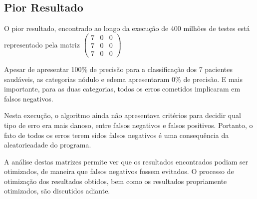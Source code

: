 \documentclass[a4paper,12pt,oneside]{report}
\begin{document}
\subsection{Pior Resultado}
\hspace*{15pt} O pior resultado, encontrado ao longo da execu\c{c}\~{a}o de 400 milh\~{o}es de testes est\'{a} representado pela matriz 
$
\left(\begin{smallmatrix}
7 & 0 & 0 \\
7 & 0 & 0 \\
7 & 0 & 0 
\end{smallmatrix}\right)
$
\\
\par Apesar de apresentar 100\% de precis\~{a}o para a classifica\c{c}\~{a}o dos 7 pacientes saud\'{a}veis, as categorias n\'{o}dulo e edema apresentaram 0\% de precis\~{a}o. E mais importante, para as duas categorias, todos os erros cometidos implicaram em falsos negativos. 
\\
\par Nesta execu\c{c}\~{a}o, o 	algoritmo ainda n\~{a}o apresentava crit\'{e}rios para decidir qual tipo de erro era mais danoso, entre falsos negativos e falsos positivos. Portanto, o fato de todos os erros terem sidos falsos negativos \'{e} uma consequ\^{e}ncia da aleatorieadade do programa. 
\\
\par A an\'{a}lise destas matrizes permite ver que os resultados encontrados podiam ser otimizados, de maneira que falsos negativos fossem evitados. O processo de otimiza\c{c}\~{a}o dos resultados obtidos, bem como os resultados propriamente otimizados, s\~{a}o discutidos adiante.
\end{document}
